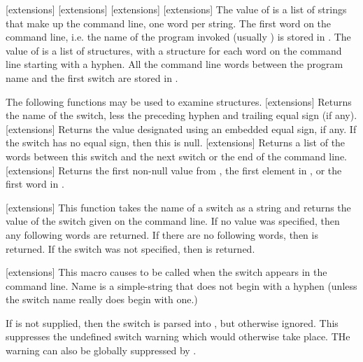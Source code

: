 {[extensions]
[extensions]
[extensions]
[extensions]
The value of  is a list of strings that make up the
command line, one word per string.  The first word on the command line, i.e.
the name of the program invoked (usually ) is stored in
.  The value of  is a
list of  structures, with a structure for each word on
the command line starting with a hyphen.  All the command line words between
the program name and the first switch are stored in .
\enddefvar

The following functions may be used to examine 
structures.
[extensions]{}
Returns the name of the switch, less the preceding hyphen and trailing equal
sign (if any).
\enddefun
{}[extensions]{}
Returns the value designated using an embedded equal sign, if any.  If the
switch has no equal sign, then this is null.
\enddefun
{}[extensions]{}
Returns a list of the words between this switch and the next switch or the end
of the command line.
\enddefun
{}[extensions]{}
Returns the first non-null value from , the first
element in , or the first word in
.
\enddefun

[extensions]{}
This function takes the name of a switch as a string and returns the value of
the switch given on the command line.  If no value was specified, then any
following words are returned.  If there are no following words, then \true{} is
returned.  If the switch was not specified, then \false{} is returned.
\enddefun

[extensions]{}
This macro causes  to be called when the switch 
appears in the command line.  Name is a simple-string that does not begin with
a hyphen (unless the switch name really does begin with one.)

If  is not supplied, then the switch is parsed into
, but otherwise ignored.  This suppresses the
undefined switch warning which would otherwise take place.  THe warning can
also be globally suppressed by .
\enddefmac

}

